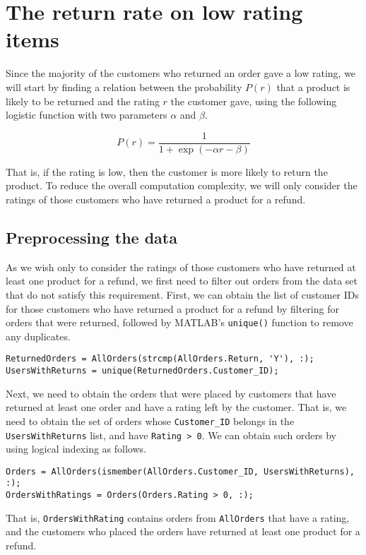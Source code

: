 \newpage
\section{The return rate on low rating items}
Since the majority of the customers who returned an order gave a low rating, we will start by finding a relation between the probability $P(r)$ that a product is likely to be returned and the rating $r$ the customer gave, using the following logistic function with two parameters $\alpha$ and $\beta$.

$$P(r) = \frac{1}{1 + \exp(-\alpha r - \beta)}$$

\noindent
That is, if the rating is low, then the customer is more likely to return the product. To reduce the overall computation complexity, we will only consider the ratings of those customers who have returned a product for a refund.

\subsection{Preprocessing the data}
As we wish only to consider the ratings of those customers who have returned at least one product for a refund, we first need to filter out orders from the data set that do not satisfy this requirement. First, we can obtain the list of customer IDs for those customers who have returned a product for a refund by filtering for orders that were returned, followed by MATLAB's \lstinline|unique()| function to remove any duplicates.

\begin{lstlisting}
ReturnedOrders = AllOrders(strcmp(AllOrders.Return, 'Y'), :);
UsersWithReturns = unique(ReturnedOrders.Customer_ID);
\end{lstlisting}

\noindent
Next, we need to obtain the orders that were placed by customers that have returned at least one order and have a rating left by the customer. That is, we need to obtain the set of orders whose \lstinline|Customer_ID| belongs in the \lstinline|UsersWithReturns| list, and have \lstinline|Rating > 0|. We can obtain such orders by using logical indexing as follows.

\begin{lstlisting}
Orders = AllOrders(ismember(AllOrders.Customer_ID, UsersWithReturns), :);
OrdersWithRatings = Orders(Orders.Rating > 0, :);
\end{lstlisting}

\noindent
That is, \lstinline|OrdersWithRating| contains orders from \lstinline|AllOrders| that have a rating, and the customers who placed the orders have returned at least one product for a refund.

